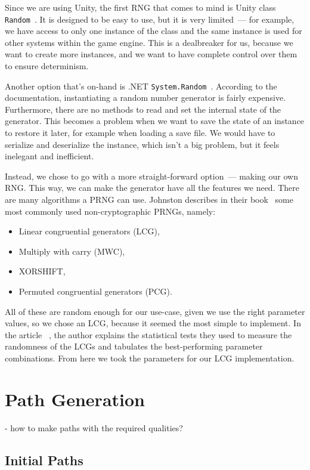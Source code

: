 Since we are using Unity, the first RNG that comes to mind is Unity class \texttt{Random}~\cite{UnityRandom}.
It is designed to be easy to use, but it is very limited~--- for example, we have access to only one instance of the class and the same instance is used for other systems within the game engine.
This is a dealbreaker for us, because we want to create more instances, and we want to have complete control over them to ensure determinism.

Another option that's on-hand is .NET \texttt{System.Random}~\cite{SystemRandom}.
According to the documentation, instantiating a random number generator is fairly expensive.
Furthermore, there are no methods to read and set the internal state of the generator.
This becomes a problem when we want to save the state of an instance to restore it later, for example when loading a save file.
We would have to serialize and deserialize the instance, which isn't a big problem, but it feels inelegant and inefficient.

Instead, we chose to go with a more straight-forward option~--- making our own RNG.
This way, we can make the generator have all the features we need.
There are many algorithms a PRNG can use.
Johnston describes in their book~\cite{johnston2018random} some most commonly used non-cryptographic PRNGs, namely:
\begin{itemize}
    \item Linear congruential generators (LCG),
    \item Multiply with carry (MWC),
    \item XORSHIFT,
    \item Permuted congruential generators (PCG).
\end{itemize}
All of these are random enough for our use-case, given we use the right parameter values, so we chose an LCG, because it seemed the most simple to implement.
In the article ~\cite{LCGTables}, the author explains the statistical tests they used to measure the randomness of the LCGs and tabulates the best-performing parameter combinations.
From here we took the parameters for our LCG implementation.


\section{Path Generation}

- how to make paths with the required qualities?

\subsection{Initial Paths}

